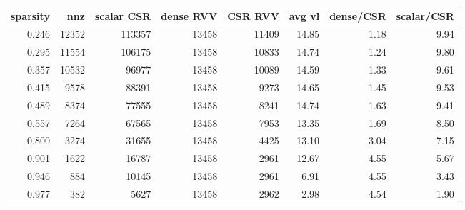 \begin{tabular}{rrrrrrrr}
\toprule
sparsity & nnz & scalar CSR & dense RVV & CSR RVV & avg vl & dense/CSR & scalar/CSR \\
\midrule
0.246 & 12352 & 113357 & 13458 & 11409 & 14.85 & 1.18 & 9.94 \\
0.295 & 11554 & 106175 & 13458 & 10833 & 14.74 & 1.24 & 9.80 \\
0.357 & 10532 & 96977 & 13458 & 10089 & 14.59 & 1.33 & 9.61 \\
0.415 & 9578 & 88391 & 13458 & 9273 & 14.65 & 1.45 & 9.53 \\
0.489 & 8374 & 77555 & 13458 & 8241 & 14.74 & 1.63 & 9.41 \\
0.557 & 7264 & 67565 & 13458 & 7953 & 13.35 & 1.69 & 8.50 \\
0.800 & 3274 & 31655 & 13458 & 4425 & 13.10 & 3.04 & 7.15 \\
0.901 & 1622 & 16787 & 13458 & 2961 & 12.67 & 4.55 & 5.67 \\
0.946 & 884 & 10145 & 13458 & 2961 & 6.91 & 4.55 & 3.43 \\
0.977 & 382 & 5627 & 13458 & 2962 & 2.98 & 4.54 & 1.90 \\
\bottomrule
\end{tabular}
